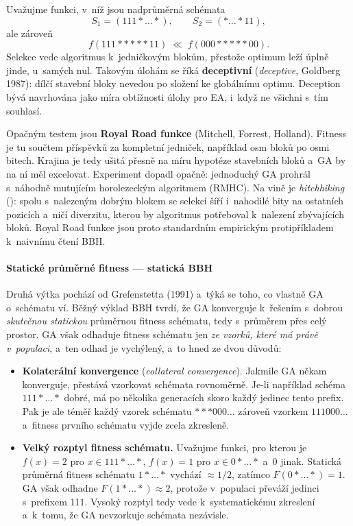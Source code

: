 \documentclass[11pt,a4paper]{article}
\theoremstyle{definition}
\begin{document}
Uvažujme funkci, v~níž jsou nadprůměrná schémata
\[
S_1 = (111{*}\ldots{*}), \qquad S_2 = ({*}\ldots{*}11),
\]
ale zároveň
\[
f(111{*}{*}{*}{*}{*}11) \;\ll\; f(000{*}{*}{*}{*}{*}00).
\]
Selekce vede algoritmus k~jedničkovým blokům, přestože optimum leží úplně jinde,
u~samých nul. Takovým úlohám se říká \textbf{deceptivní} (\emph{deceptive},
Goldberg 1987): dílčí stavební bloky nevedou po složení ke globálnímu optimu.
Deception bývá navrhována jako míra obtížnosti úlohy pro EA, i~když ne všichni
s~tím souhlasí.

Opačným testem jsou \textbf{Royal Road funkce} (Mitchell, Forrest, Holland). Fitness
je tu součtem příspěvků za kompletní  jedniček, například osm bloků po
osmi bitech. Krajina je tedy ušitá přesně na míru hypotéze stavebních bloků a~GA by na
ní měl excelovat. Experiment dopadl opačně: jednoduchý GA prohrál s~náhodně mutujícím
horolezeckým algoritmem (RMHC). Na vině je \emph{hitchhiking} (): spolu
s~nalezeným dobrým blokem se selekcí šíří i~nahodilé  bity na ostatních
pozicích a~ničí diverzitu, kterou by algoritmus potřeboval k~nalezení zbývajících bloků.
Royal Road funkce jsou proto standardním empirickým protipříkladem k~naivnímu čtení BBH.

\paragraph{Statické průměrné fitness --- statická BBH}

Druhá výtka pochází od Grefenstetta (1991) a~týká se toho, co vlastně GA o~schématu ví.
Běžný výklad BBH tvrdí, že GA konverguje k~řešením s~dobrou \emph{skutečnou statickou}
průměrnou fitness schématu, tedy s~průměrem přes celý prostor. GA však odhaduje fitness
schématu jen \emph{ze vzorků, které má právě v~populaci}, a~ten odhad je vychýlený,
a~to hned ze dvou důvodů:

\begin{itemize}
\item \textbf{Kolaterální konvergence} (\emph{collateral convergence}).
  Jakmile GA někam konverguje, přestává vzorkovat schémata rovnoměrně.
  Je-li například schéma $111{*}\ldots{*}$ dobré, má po několika generacích
  skoro každý jedinec tento prefix. Pak je ale téměř každý vzorek schématu
  ${*}{*}{*}000\ldots$ zároveň vzorkem $111000\ldots$ a~fitness prvního
  schématu vyjde zcela zkresleně.
\item \textbf{Velký rozptyl fitness schématu.} Uvažujme funkci, pro kterou je
  $f(x) = 2$ pro $x \in 111{*}\ldots{*}$, $f(x)=1$ pro $x \in 0{*}\ldots{*}$
  a~$0$ jinak. Statická průměrná fitness schématu $1{*}\ldots{*}$ vychází $\approx 1/2$,
  zatímco $F(0{*}\ldots{*}) = 1$. GA však odhadne
  $F(1{*}\ldots{*}) \approx 2$, protože v~populaci převáží jedinci
  s~prefixem 111. Vysoký rozptyl tedy vede k~systematickému zkreslení a~k~tomu,
  že GA nevzorkuje schémata nezávisle.
\end{itemize}
\end{document}

